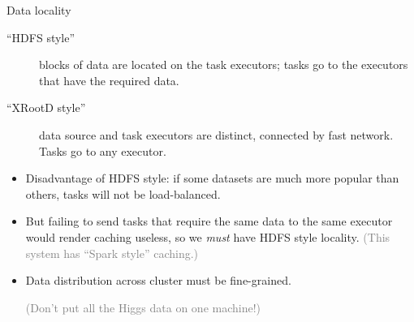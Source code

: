 \documentclass{beamer}
\begin{document}
\begin{frame}{Data locality}
\begin{description}
\item[``HDFS style''] blocks of data are located on the task executors; tasks go to the executors that have the required data.
\item[``XRootD style''] data source and task executors are distinct, connected by fast network. Tasks go to any executor.
\end{description}

\begin{itemize}
\item<2-> Disadvantage of HDFS style: if some datasets are much more popular than others, tasks will not be load-balanced.
\item<3-> But failing to send tasks that require the same data to the same executor would render caching useless, so we {\it must} have HDFS style locality. \textcolor{gray}{(This system has ``Spark style'' caching.)}
\item<4-> Data distribution across cluster must be fine-grained.

\textcolor{gray}{(Don't put all the Higgs data on one machine!)}
\end{itemize}
\end{frame}
\end{document}
